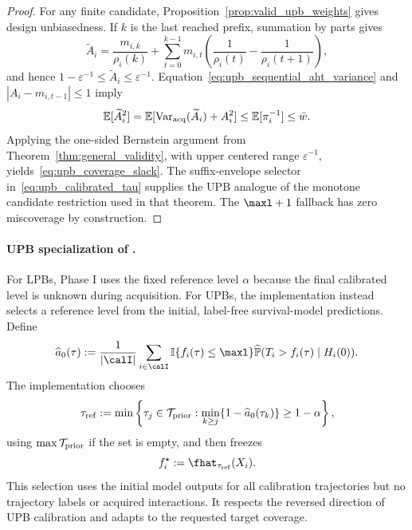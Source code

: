 \begin{proof}
For any finite candidate, Proposition~\ref{prop:valid_upb_weights} gives
design unbiasedness. If $k$ is the last reached prefix, summation by parts
gives
\[
    \widetilde A_i
    =\frac{m_{i,k}}{\rho_i(k)}
      +\sum_{t=0}^{k-1}m_{i,t}
        \left(\frac{1}{\rho_i(t)}-\frac{1}{\rho_i(t+1)}\right),
\]
and hence $1-\varepsilon^{-1}\leq\widetilde A_i\leq\varepsilon^{-1}$.
Equation~\eqref{eq:upb_sequential_aht_variance} and
$|A_i-m_{i,t-1}|\leq1$ imply
\[
    \mathbb E[\widetilde A_i^2]
    =\mathbb E[\operatorname{Var}_{\rm acq}(\widetilde A_i)+A_i^2]
    \leq\mathbb E[\pi_i^{-1}]
    \leq\bar w.
\]
Applying the one-sided Bernstein argument from
Theorem~\ref{thm:general_validity}, with upper centered range
$\varepsilon^{-1}$, yields~\eqref{eq:upb_coverage_slack}. The suffix-envelope
selector in~\eqref{eq:upb_calibrated_tau} supplies the UPB analogue of the
monotone candidate restriction used in that theorem. The $\maxl+1$ fallback
has zero miscoverage by construction.
\end{proof}

\paragraph{UPB specialization of \ttmethod.}
For LPBs, Phase I uses the fixed reference level $\alpha$ because the final
calibrated level is unknown during acquisition. For UPBs, the implementation
instead selects a reference level from the initial, label-free survival-model
predictions. Define
\begin{equation}
    \widehat a_0(\tau)
    :=\frac{1}{|\calI|}\sum_{i\in\calI}
      \mathbb I\{f_i(\tau)\leq\maxl\}
      \widehat{\mathbb P}(T_i>f_i(\tau)\mid H_i(0)).
\end{equation}
The implementation chooses
\begin{equation}
    \tau_{\rm ref}
    :=\min\left\{
      \tau_j\in\mathcal T_{\rm prior}:
      \min_{k\geq j}\{1-\widehat a_0(\tau_k)\}\geq1-\alpha
    \right\},
    \label{eq:upb_reference_level}
\end{equation}
using $\max\mathcal T_{\rm prior}$ if the set is empty, and then freezes
\begin{equation}
    f_i^\star:=\fhat_{\tau_{\rm ref}}(X_i).
\end{equation}
This selection uses the initial model outputs for all calibration trajectories
but no trajectory labels or acquired interactions. It respects the reversed
direction of UPB calibration and adapts to the requested target coverage.

